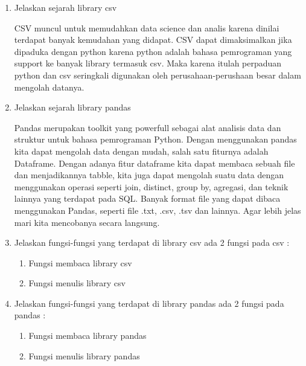 \begin{enumerate}
	\item Jelaskan sejarah library csv
	
	CSV muncul untuk memudahkan data science dan analis karena dinilai terdapat banyak kemudahan yang didapat. CSV dapat dimaksimalkan jika dipaduka dengan python karena python adalah bahasa pemrograman yang support ke banyak library termasuk csv. Maka karena itulah perpaduan python dan csv seringkali digunakan oleh perusahaan-perushaan besar dalam mengolah datanya.
	
	\item Jelaskan sejarah library pandas

	Pandas merupakan toolkit yang powerfull sebagai alat analisis data dan struktur untuk bahasa pemrograman Python. Dengan menggunakan pandas kita dapat mengolah data dengan mudah, salah satu fiturnya adalah Dataframe. Dengan adanya fitur dataframe kita dapat membaca sebuah file dan menjadikannya tabble, kita juga dapat mengolah suatu data dengan menggunakan operasi seperti join, distinct, group by, agregasi, dan teknik lainnya yang terdapat pada SQL. Banyak format file yang dapat dibaca menggunakan Pandas, seperti file .txt, .csv, .tsv dan lainnya. Agar lebih jelas mari kita mencobanya secara langsung.
	
	\item Jelaskan fungsi-fungsi yang terdapat di library csv
	ada 2 fungsi pada csv :
	\begin{enumerate}
	\item Fungsi membaca library csv
		
	
		
	\item Fungsi menulis library csv
		
	
	\end{enumerate}

	\item Jelaskan fungsi-fungsi yang terdapat di library pandas
			ada 2 fungsi pada pandas :
	\begin{enumerate}
	\item Fungsi membaca library pandas
		
	
		
	\item Fungsi menulis library pandas
		
	
	\end{enumerate}
		
\end{enumerate}   

